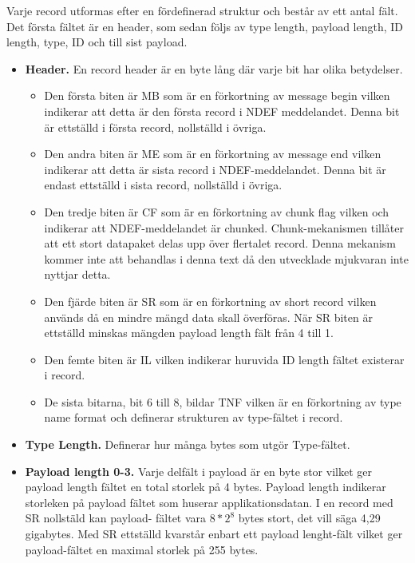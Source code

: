 \documentclass[11pt]{article}
\begin{document}

Varje record utformas efter en fördefinerad struktur och består av ett antal fält. Det första fältet är en header, som sedan följs av type length, payload length, ID length, type, ID och till sist payload.


\begin{itemize}
\item \textbf{Header.} En record header är en byte lång där varje bit har olika betydelser.
\begin{itemize}
\item Den första biten är MB som är en förkortning av message begin vilken indikerar att detta är den första record i NDEF meddelandet. Denna bit är ettställd i första record, nollställd i övriga.
\item Den andra biten är ME som är en förkortning av message end vilken indikerar att detta är sista record i NDEF-meddelandet. Denna bit är endast ettställd i sista record, nollställd i övriga.
\item Den tredje biten är CF som är en förkortning av chunk flag vilken och indikerar att NDEF-meddelandet är chunked. Chunk-mekanismen tillåter att ett stort datapaket delas upp över flertalet record. Denna mekanism kommer inte att behandlas i denna text då den utvecklade mjukvaran inte nyttjar detta.
\item Den fjärde biten är SR som är en förkortning av short record vilken används då en mindre mängd data skall överföras. När SR biten är ettställd minskas mängden payload length fält från 4 till 1.
\item Den femte biten är IL vilken indikerar huruvida ID length fältet existerar i record.
\item De sista bitarna, bit 6 till 8, bildar TNF vilken är en förkortning av type name format och definerar strukturen av type-fältet i record.
\end{itemize}
\item \textbf{Type Length.} Definerar hur många bytes som utgör Type-fältet.
\item \textbf{Payload length 0-3.} Varje delfält i payload är en byte stor vilket ger payload length fältet en total storlek på 4 bytes. Payload length indikerar storleken på payload fältet som huserar applikationsdatan. I en record med SR nollstäld kan payload- fältet vara  $8*2^8$ bytes stort, det vill säga 4,29 gigabytes. Med SR ettställd kvarstår enbart ett payload lenght-fält vilket ger  payload-fältet en maximal storlek på 255 bytes.

\end{itemize}
\end{document}
